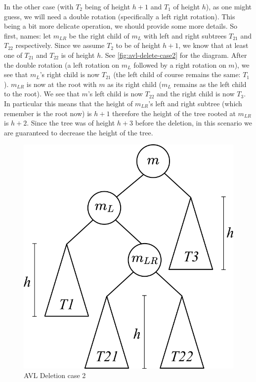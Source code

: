 In the other case (with $T_2$ being of height $h + 1$ and $T_1$ of height $h$), as one might guess, we will need a double rotation (specifically a left right rotation). This being a bit more delicate operation, we should provide some more details. So first, names: let $m_{LR}$ be the right child of $m_L$ with left and right subtrees $T_{21}$ and $T_{22}$ respectively. Since we assume $T_2$ to be of height $h + 1$, we know that at least one of $T_{21}$ and $T_{22}$ is of height $h$. See \autoref{fig:avl-delete-case2} for the diagram. After the double rotation (a left rotation on $m_L$ followed by a right rotation on $m$), we see that $m_L$'s right child is now $T_{21}$ (the left child of course remains the same: $T_{1}$).
$m_{LR}$ is now at the root with $m$ as its right child ($m_L$ remains as the left child to the root). We see that $m$'s left child is now $T_{22}$ and the right child is now $T_3$. In particular this means that the height of $m_{LR}$'s left and right subtree (which remember is the root now) is $h + 1$ therefore the height of the tree rooted at $m_{LR}$ is $h + 2$. Since the tree was of height $h + 3$ before the deletion, in this scenario we are guaranteed to decrease the height of the tree.

\begin{figure}[h]
    \centering
    \includegraphics[scale=0.5]{Images/avl_delete_case2.png}
    \caption{AVL Deletion case 2}
    \label{fig:avl-delete-case2}
\end{figure}

